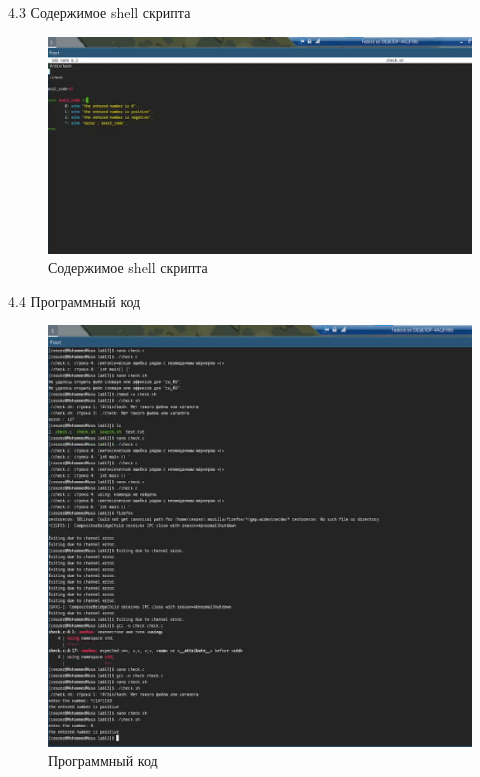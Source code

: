 \documentclass[
  ignorenonframetext,
  aspectratio=169,
  russian,
]{beamer}
\begin{document}
\begin{frame}{4.3 Содержимое shell скрипта}
\label{ux441ux43eux434ux435ux440ux436ux438ux43cux43eux435-shell-ux441ux43aux440ux438ux43fux442ux430}
\begin{figure}[H]

{\centering \includegraphics[width=0.7\linewidth,height=\textheight,keepaspectratio]{image/shcontent1.png}

}

\caption{Содержимое shell скрипта}

\end{figure}%
\end{frame}

\begin{frame}{4.4 Программный код}
\label{ux43fux440ux43eux433ux440ux430ux43cux43cux43dux44bux439-ux43aux43eux434}
\begin{figure}[H]

{\centering \includegraphics[width=0.7\linewidth,height=\textheight,keepaspectratio]{image/program1.png}

}

\caption{Программный код}

\end{figure}%
\end{frame}
\end{document}
